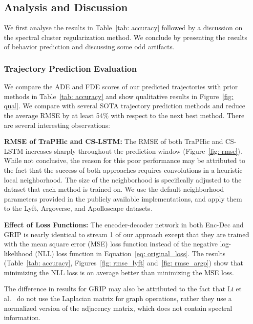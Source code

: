 \documentclass[10pt,twocolumn,letterpaper]{article}
\theoremstyle{plain}
\begin{document}
\subsection{Analysis and Discussion}
\label{subsec: analysis_and_discussion}


We first analyse the results in Table~\ref{tab: accuracy} followed by a discussion on the spectral cluster regularization method. We conclude by presenting the results of behavior prediction and discussing some odd artifacts.

\subsubsection{Trajectory Prediction Evaluation}
We compare the ADE and FDE scores of our predicted trajectories with prior methods in Table~\ref{tab: accuracy} and show qualitative results in Figure~\ref{fig: qual}. We compare with several SOTA trajectory prediction methods and reduce the average RMSE by at least 54\% with respect to the next best method. There are several interesting observations:

\textbf{RMSE of TraPHic and CS-LSTM:} The RMSE of both TraPHic and CS-LSTM increases sharply throughout the prediction window (Figure~\ref{fig: rmse}). While not conclusive, the reason for this poor performance may be attributed to the fact that the success of both approaches requires convolutions in a heuristic local neighborhood. The size of the neighborhood is specifically adjusted to the dataset that each method is trained on. We use the default neighborhood parameters provided in the publicly available implementations, and apply them to the Lyft, Argoverse, and Apolloscape datasets.


\textbf{Effect of Loss Functions:} The encoder-decoder network in both Enc-Dec and GRIP is nearly identical to stream 1 of our approach except that they are trained with the mean square error (MSE) loss function instead of the negative log-likelihood (NLL) loss function in Equation~\ref{eq: original_loss}. The results (Table~\ref{tab: accuracy}, Figures~\ref{fig: rmse_lyft} and~\ref{fig: rmse_argo}) show that minimizing the NLL loss is on average better than minimizing the MSE loss. 


The difference in results for GRIP may also be attributed to the fact that Li et al.~\cite{li2019grip} do not use the Laplacian matrix for graph operations, rather they use a normalized version of the adjacency matrix, which does not contain spectral information.
\end{document}

